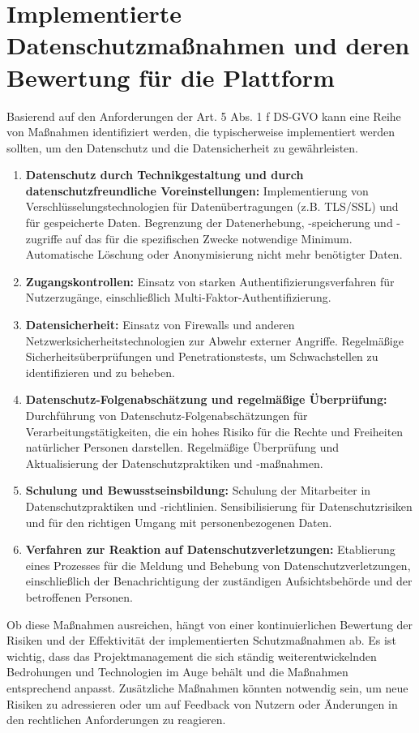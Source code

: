 \chapter{Implementierte Datenschutzmaßnahmen und deren Bewertung für die Plattform}

Basierend auf den Anforderungen der Art. 5 Abs. 1 f DS-GVO kann eine Reihe von Maßnahmen identifiziert werden, die typischerweise implementiert werden sollten, um den Datenschutz und die Datensicherheit zu gewährleisten.

\begin{enumerate}
    
    \item \textbf{Datenschutz durch Technikgestaltung und durch datenschutzfreundliche Voreinstellungen:}
    Implementierung von Verschlüsselungstechnologien für Datenübertragungen (z.B. TLS/SSL) und für gespeicherte Daten. Begrenzung der Datenerhebung, -speicherung und -zugriffe auf das für die spezifischen Zwecke notwendige Minimum.
    Automatische Löschung oder Anonymisierung nicht mehr benötigter Daten.
    
    \item \textbf{Zugangskontrollen:}
    Einsatz von starken Authentifizierungsverfahren für Nutzerzugänge, einschließlich Multi-Faktor-Authentifizierung.
    
    \item \textbf{Datensicherheit:}
    Einsatz von Firewalls und anderen Netzwerksicherheitstechnologien zur Abwehr externer Angriffe. Regelmäßige Sicherheitsüberprüfungen und Penetrationstests, um Schwachstellen zu identifizieren und zu beheben.
    
    \item \textbf{Datenschutz-Folgenabschätzung und regelmäßige Überprüfung:}
    Durchführung von Datenschutz-Folgenabschätzungen für Verarbeitungstätigkeiten, die ein hohes Risiko für die Rechte und Freiheiten natürlicher Personen darstellen. Regelmäßige Überprüfung und Aktualisierung der Datenschutzpraktiken und -maßnahmen.
    
    \item \textbf{Schulung und Bewusstseinsbildung:}
    Schulung der Mitarbeiter in Datenschutzpraktiken und -richtlinien.
    Sensibilisierung für Datenschutzrisiken und für den richtigen Umgang mit personenbezogenen Daten.
    
    \item \textbf{Verfahren zur Reaktion auf Datenschutzverletzungen:}
    Etablierung eines Prozesses für die Meldung und Behebung von Datenschutzverletzungen, einschließlich der Benachrichtigung der zuständigen Aufsichtsbehörde und der betroffenen Personen.
\end{enumerate}
    
    Ob diese Maßnahmen ausreichen, hängt von einer kontinuierlichen Bewertung der Risiken und der Effektivität der implementierten Schutzmaßnahmen ab. Es ist wichtig, dass das Projektmanagement die sich ständig weiterentwickelnden Bedrohungen und Technologien im Auge behält und die Maßnahmen entsprechend anpasst. Zusätzliche Maßnahmen könnten notwendig sein, um neue Risiken zu adressieren oder um auf Feedback von Nutzern oder Änderungen in den rechtlichen Anforderungen zu reagieren.